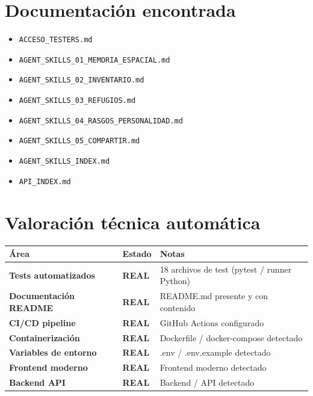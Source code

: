 \documentclass[10pt,a4paper]{article}
\newcommand{\badge}[2][accent]{\colorbox{#1!15}{\small\color{#1}\textbf{#2}}}
\newcommand{\real}{\badge[green]{REAL}}
\begin{document}
\section{Documentación encontrada}

\begin{itemize}[leftmargin=1em, itemsep=2pt]
  \item \texttt{ACCESO\_TESTERS.md}
  \item \texttt{AGENT\_SKILLS\_01\_MEMORIA\_ESPACIAL.md}
  \item \texttt{AGENT\_SKILLS\_02\_INVENTARIO.md}
  \item \texttt{AGENT\_SKILLS\_03\_REFUGIOS.md}
  \item \texttt{AGENT\_SKILLS\_04\_RASGOS\_PERSONALIDAD.md}
  \item \texttt{AGENT\_SKILLS\_05\_COMPARTIR.md}
  \item \texttt{AGENT\_SKILLS\_INDEX.md}
  \item \texttt{API\_INDEX.md}
\end{itemize}

\section{Valoración técnica automática}

\begin{tabularx}{\linewidth}{>{\bfseries}p{4.5cm} >{\centering\arraybackslash}p{2.5cm} X}
  \toprule
  Área & Estado & Notas \\
  \midrule
  Tests automatizados   & \real   & 18 archivos de test (pytest / runner Python) \\[3pt]
  Documentación README  & \real  & README.md presente y con contenido \\[3pt]
  CI/CD pipeline        & \real      & GitHub Actions configurado \\[3pt]
  Containerización      & \real  & Dockerfile / docker-compose detectado \\[3pt]
  Variables de entorno  & \real     & .env / .env.example detectado \\[3pt]
  Frontend moderno      & \real & Frontend moderno detectado \\[3pt]
  Backend API           & \real & Backend / API detectado \\
  \bottomrule
\end{tabularx}
\end{document}
